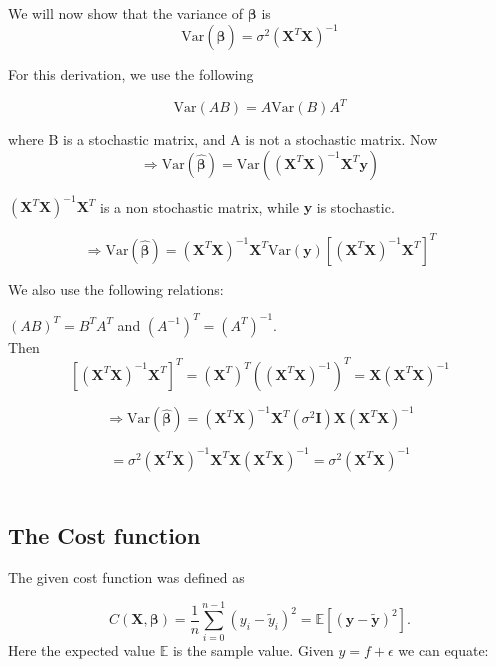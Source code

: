 \documentclass[reprint,english,notitlepage]{revtex4-1}  %
\begin{document}
    We will now show that the variance of $\boldsymbol{\beta}$ is \\

    $$\mathrm{Var}(\boldsymbol{\hat{\beta}}) = \sigma^2 (\mathbf{X}^T \mathbf{X})^{-1}$$

    
    
    For this derivation, we use the following

    $$\mathrm{Var}(AB) = A \mathrm{Var}(B) A^T$$

    where B is a stochastic matrix, and A is not a stochastic matrix. Now \\

    $$\Rightarrow \mathrm{Var}(\boldsymbol{\hat{\beta}}) = \mathrm{Var}((\mathbf{X}^T\mathbf{X})^{-1}\mathbf{X}^T\mathbf{y})$$

    
    $(\mathbf{X}^T\mathbf{X})^{-1}\mathbf{X}^T$ is a non stochastic matrix, while $\mathbf{y}$ is stochastic. 

    $$\Rightarrow \mathrm{Var}(\boldsymbol{\hat{\beta}}) = (\mathbf{X}^T\mathbf{X})^{-1}\mathbf{X}^T \mathrm{Var}(\mathbf{y})[(\mathbf{X}^T\mathbf{X})^{-1}\mathbf{X}^T]^T$$

    We also use the following relations:

    $(AB)^T = B^TA^T$ and $(A^{-1})^T = (A^T)^{-1}$. \\

    Then 
    $$[(\mathbf{X}^T\mathbf{X})^{-1}\mathbf{X}^T]^T = (\mathbf{X}^T)^T((\mathbf{X}^T\mathbf{X})^{-1})^T = \mathbf{X}(\mathbf{X}^T\mathbf{X})^{-1}$$

    $$\Rightarrow \mathrm{Var}(\boldsymbol{\hat{\beta}}) = (\mathbf{X}^T\mathbf{X})^{-1}\mathbf{X}^T (\sigma^2 \boldsymbol{I}) \mathbf{X} (\mathbf{X}^T\mathbf{X})^{-1}$$


    $$= \sigma^2 (\mathbf{X}^T\mathbf{X})^{-1}\mathbf{X}^T  \mathbf{X} (\mathbf{X}^T\mathbf{X})^{-1} = \sigma^2(\mathbf{X}^T\mathbf{X})^{-1}$$\\

\subsection{The Cost function}

The given cost function was defined as

\[
C(\bm{X},\bm{\beta}) =\frac{1}{n}\sum_{i=0}^{n-1}(y_i-\tilde{y}_i)^2=\mathbb{E}\left[(\bm{y}-\bm{\tilde{y}})^2\right].
\]
Here the expected value $\mathbb{E}$ is the sample value. Given $y = f + \epsilon$ we can equate:
\end{document}
